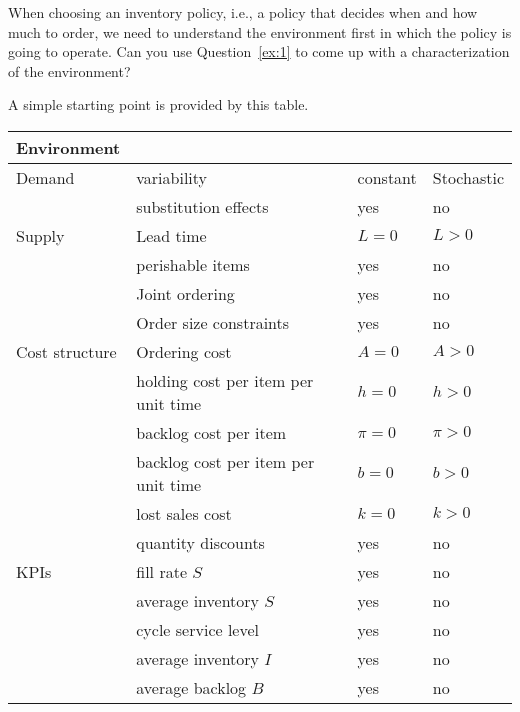 



\begin{exercise}
  When choosing an inventory policy, i.e., a policy that decides when
  and how much to order, we need to understand the environment first
  in which the policy is going to operate. Can you use
  Question~\ref{ex:1} to come up with a characterization of the environment? 
  \begin{solution}
    A simple starting point is provided by this table.

    \begin{tabular}{l|l|l|l}
      Environment && &  \\ \hline
Demand & variability & constant & Stochastic \\ 
& substitution effects & yes & no \\
\hline Supply & Lead time & $L=0$& $L>0$ \\ 
& perishable items & yes & no\\
& Joint ordering & yes & no\\
& Order size constraints &yes & no \\
\hline Cost structure &Ordering cost & $A=0$ & $A>0$ \\ 
& holding cost per item per unit time& $h=0$ &$h>0$ \\
& backlog cost per item & $\pi=0$ &$\pi>0$\\
& backlog cost per item per unit time & $b=0$ &$b>0$\\
&lost sales cost &$k=0$ & $k>0$ \\
&quantity discounts &yes & no \\
\hline KPIs &fill rate $S$ & yes & no\\ 
 &average inventory  $S$ & yes & no\\ 
& cycle service level &yes& no\\
 &average inventory  $I$ & yes & no\\ 
 & average backlog  $B$ & yes & no\\ 
    \end{tabular}
  \end{solution}
\end{exercise}

